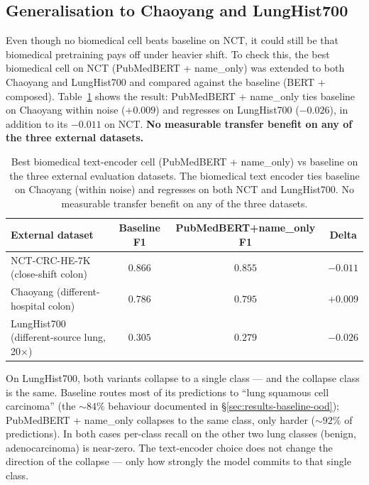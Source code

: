 \subsection{Generalisation to Chaoyang and LungHist700}

Even though no biomedical cell beats baseline on NCT, it could still be that biomedical pretraining pays off under heavier shift. To check this, the best biomedical cell on NCT (PubMedBERT + name\_only) was extended to both Chaoyang and LungHist700 and compared against the baseline (BERT + composed). Table~\ref{tab:text-encoder-3way} shows the result: PubMedBERT + name\_only ties baseline on Chaoyang within noise ($+0.009$) and regresses on LungHist700 ($-0.026$), in addition to its $-0.011$ on NCT. \textbf{No measurable transfer benefit on any of the three external datasets.}

\begin{table}[ht]
    \centering
    \small
    \begin{tabular}{|l|c|c|c|}
    \hline
    \textbf{External dataset} & \textbf{Baseline F1} & \textbf{PubMedBERT+name\_only F1} & \textbf{Delta} \\ \hline
    NCT-CRC-HE-7K (close-shift colon)               & $0.866$ & $0.855$ & $-0.011$ \\ \hline
    Chaoyang (different-hospital colon)             & $0.786$ & $0.795$ & $+0.009$ \\ \hline
    LungHist700 (different-source lung, 20$\times$)  & $0.305$ & $0.279$ & $-0.026$ \\ \hline
    \end{tabular}
    \caption{Best biomedical text-encoder cell (PubMedBERT + name\_only) vs baseline on the three external evaluation datasets. The biomedical text encoder ties baseline on Chaoyang (within noise) and regresses on both NCT and LungHist700. No measurable transfer benefit on any of the three datasets.}
    \label{tab:text-encoder-3way}
\end{table}

On LungHist700, both variants collapse to a single class --- and the collapse class is the same. Baseline routes most of its predictions to ``lung squamous cell carcinoma'' (the $\sim 84\%$ behaviour documented in §\ref{sec:results-baseline-ood}); PubMedBERT + name\_only collapses to the same class, only harder ($\sim 92\%$ of predictions). In both cases per-class recall on the other two lung classes (benign, adenocarcinoma) is near-zero. The text-encoder choice does not change the direction of the collapse --- only how strongly the model commits to that single class.

